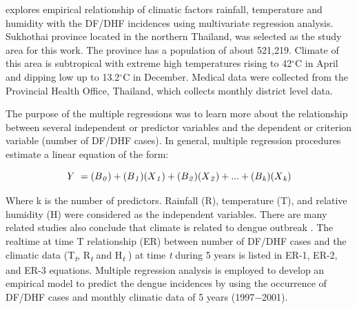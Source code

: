 \documentclass[review]{elsarticle}
\begin{document}

\cite{nakhapakorn2005information} explores empirical relationship of climatic factors rainfall, temperature and humidity with the DF/DHF incidences using multivariate regression analysis. Sukhothai province located in the northern Thailand, was selected as the study area for this work.  The province has a population of about 521,219. Climate of this area is subtropical with extreme high temperatures rising to 42$^{\circ}$C in April and dipping low up to 13.2$^{\circ}$C in December. Medical data were collected from the Provincial Health Office, Thailand, which collects monthly district level data.  

The purpose of the multiple regressions was to learn more about the relationship between several independent or predictor variables and the dependent or criterion variable (number of DF/DHF cases). 
In general, multiple regression procedures estimate a linear equation of the form:

\begin{equation}
\label{eq:linear}
Y\ =   (B\textsubscript{\textit{0}}) + (B\textsubscript{\textit{1}})(X\textsubscript{\textit{1}}) + (B\textsubscript{\textit{2}})(X\textsubscript{\textit{2}}) + ... + (B\textsubscript{\textit{k}})(X\textsubscript{\textit{k}}) 
\end{equation}

Where k is the number of predictors. Rainfall (R), temperature (T), and relative humidity (H) were considered as the independent variables. There are many related studies also conclude that climate is related to dengue outbreak \cite{li1985rainfall,hales2002potential,rueda1990temperature,tun2000effects,brady2013modelling}. The realtime at time T relationship (ER) between number of DF/DHF cases and the climatic data  (T\textsubscript{\textit{t}}, R\textsubscript{\textit{t}} and H\textsubscript{\textit{t}} ) at time \textit{t} during 5 years is listed in ER-1, ER-2, and ER-3 equations. Multiple regression analysis is employed to develop an empirical model to predict the dengue incidences by using the occurrence of DF/DHF cases and monthly climatic data of 5 years (1997$-$2001).
\end{document}
